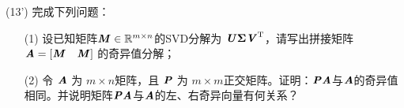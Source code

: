 \documentclass[12pt,a4paper,openany,twoside]{ctexbook}
\begin{document}
\begin{exercise}(13')
	完成下列问题：
 \begin{itemize}
 	\item [(1)] 设已知矩阵$ \MM \in \mathbb{R}^{m \times n} $的SVD分解为 $\MU \MSigma \MV\T$，请写出拼接矩阵 $\MA = [\MM \quad \MM]$ 的奇异值分解；
 	\item [(2)] 令 $\MA$ 为 $m\times n$矩阵，且 $\MP$ 为 $m\times m$正交矩阵。证明：$\MP \MA$与$\MA$的奇异值相同。并说明矩阵$\MP \MA$与$\MA$的左、右奇异向量有何关系？
 \end{itemize}
\end{exercise}
%		
%
%	
%	
%	
%	
\end{document}
